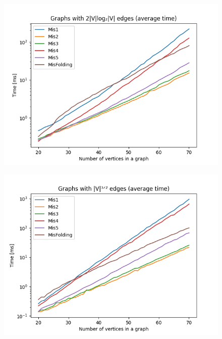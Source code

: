 \begin{figure}[H]
\includegraphics[width=\textwidth]{4_benchmark/plots/2nlogn.png}
\centering
\end{figure}

\begin{figure}[H]
\includegraphics[width=\textwidth]{4_benchmark/plots/1n32.png}
\centering
\end{figure}

